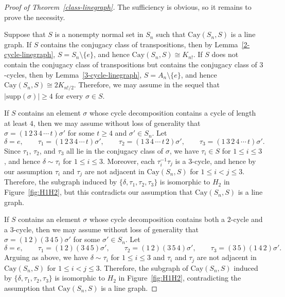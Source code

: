 \documentclass[12pt, a4paper]{article}
\theoremstyle{definition}
\begin{document}
\begin{proof}[Proof of Theorem~\ref{class-linegraph}]
The sufficiency is obvious, so it remains to prove the necessity.

Suppose that $S$ is a nonempty normal set in $S_n$ such that $\mathrm{Cay}(S_n,S)$ is a line graph. If $S$ contains the conjugacy class of transpositions, then by Lemma~\ref{2-cycle-linegraph}, $S=S_n\setminus\{e\}$, and hence $\mathrm{Cay}(S_n,S)\cong K_{n!}$. If $S$ does not contain the conjugacy class of transpositions but contains the conjugacy class of $3$-cycles, then by Lemma~\ref{3-cycle-linegraph}, $S=A_n\setminus\{e\}$, and hence $\mathrm{Cay}(S_n,S)\cong 2K_{n!/2}$. Therefore, we may assume in the sequel that $|\mathrm{supp}(\sigma)|\ge 4$ for every $\sigma\in S$. 

If $S$ contains an element $\sigma$ whose cycle decomposition contains a cycle of length at least $4$, then we may assume without loss of generality that
\(
\sigma=(1\,2\,3\,4\,\cdots\,t)\sigma'
\)
for some $t\ge 4$ and $\sigma' \in S_n$. Let
\[
\delta=e,\qquad
\tau_1=(1\,2\,3\,4\,\cdots\,t)\sigma',\qquad
\tau_2=(1\,3\,4\,\cdots\,t\,2)\sigma',\qquad
\tau_3=(1\,3\,2\,4\,\cdots\,t)\sigma'.
\]
Since $\tau_1$, $\tau_2$, and $\tau_3$ all lie in the conjugacy class of $\sigma$, we have $\tau_i\in S$ for $1\le i\le 3$, and hence $\delta\sim\tau_i$ for $1\le i\le 3$. Moreover, each $\tau_i^{-1}\tau_j$ is a $3$-cycle, and hence by our assumption $\tau_i$ and $\tau_j$ are not adjacent in $\mathrm{Cay}(S_n,S)$ for $1\le i<j\le 3$. Therefore, the subgraph induced by $\{\delta,\tau_1,\tau_2,\tau_3\}$ is isomorphic to $H_2$ in Figure~\ref{fig:H1H2}, but this contradicts our assumption that $\mathrm{Cay}(S_n,S)$ is a line graph.

If $S$ contains an element $\sigma$ whose cycle decomposition contains both a $2$-cycle and a $3$-cycle, then we may assume without loss of generality that
\(
\sigma=(1\,2)(3\,4\,5)\sigma'
\)
for some $\sigma' \in S_n$. Let
\[
\delta=e,\qquad
\tau_1=(1\,2)(3\,4\,5)\sigma',\qquad
\tau_2=(1\,2)(3\,5\,4)\sigma',\qquad
\tau_3=(3\,5)(1\,4\,2)\sigma'.
\]
Arguing as above, we have $\delta\sim\tau_i$ for $1\le i\le 3$ and $\tau_i$ and $\tau_j$ are not adjacent in $\mathrm{Cay}(S_n,S)$ for $1\le i<j\le 3$. Therefore, the subgraph of $\mathrm{Cay}(S_n,S)$ induced by $\{\delta,\tau_1,\tau_2,\tau_3\}$ is isomorphic to $H_2$ in Figure~\ref{fig:H1H2}, contradicting the assumption that $\mathrm{Cay}(S_n,S)$ is a line graph.


\end{proof}
\end{document}
